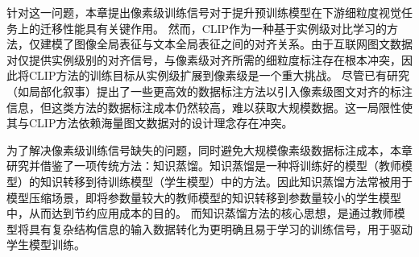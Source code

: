 

针对这一问题，本章提出像素级训练信号对于提升预训练模型在下游细粒度视觉任务上的迁移性能具有关键作用。%
然而，CLIP作为一种基于实例级对比学习的方法，仅建模了图像全局表征与文本全局表征之间的对齐关系。由于互联网图文数据对仅提供实例级别的对齐信号，与像素级对齐所需的细粒度标注存在根本冲突，因此将CLIP方法的训练目标从实例级扩展到像素级是一个重大挑战。%
尽管已有研究（如局部化叙事\cite{LocNar}）提出了一些更高效的数据标注方法以引入像素级图文对齐的标注信息，但这类方法的数据标注成本仍然较高，难以获取大规模数据。这一局限性使其与CLIP方法依赖海量图文数据对的设计理念存在冲突。

为了解决像素级训练信号缺失的问题，同时避免大规模像素级数据标注成本，本章研究并借鉴了一项传统方法：知识蒸馏\cite{hinton2015knowledge}。知识蒸馏是一种将训练好的模型（教师模型）的知识转移到待训练模型（学生模型）中的方法。因此知识蒸馏方法常被用于模型压缩场景，即将参数量较大的教师模型的知识转移到参数量较小的学生模型中，从而达到节约应用成本的目的。
而知识蒸馏方法的核心思想，是通过教师模型将具有复杂结构信息的输入数据转化为更明确且易于学习的训练信号，用于驱动学生模型训练。

